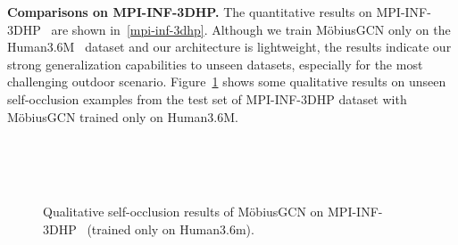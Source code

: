 \documentclass[runningheads]{llncs}
\begin{document}
 \vspace{-25px}
\textbf{Comparisons on MPI-INF-3DHP.} The quantitative results on MPI-INF-3DHP~\cite{mono-3dhp2017} are shown in~\autoref{mpi-inf-3dhp}. Although we train M\"obiusGCN only on the Human3.6M~\cite{h36m_pami} dataset and our architecture is lightweight, the results indicate our strong generalization capabilities to unseen datasets, especially for the most challenging outdoor scenario.
Figure~\ref{qual-res-mpi-inf} shows some qualitative results on unseen self-occlusion examples from the test set of MPI-INF-3DHP dataset with M\"obiusGCN trained only on Human3.6M. 
\begin{figure}
\centering
{}
\quad
{}
\quad
{}\\ 
\quad
{}
\quad
{} \\
\quad
{}
\quad
{} \\
\caption{\scriptsize{Qualitative self-occlusion results of M\"obiusGCN on MPI-INF-3DHP~\cite{mono-3dhp2017} (trained only on Human3.6m).}}
\label{qual-res-mpi-inf}
\end{figure}
\end{document}
